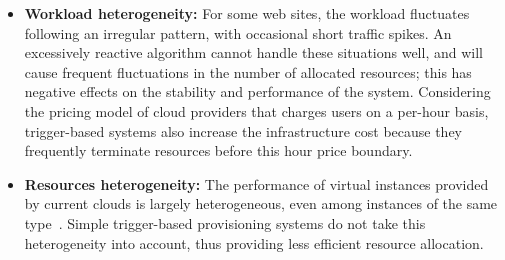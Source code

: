 \begin{itemize}
\item \textbf{Workload heterogeneity:} For some web sites, the
  workload fluctuates following an irregular pattern, with occasional
  short traffic spikes. An excessively reactive algorithm cannot
  handle these situations well, and will cause frequent fluctuations
  in the number of allocated resources; this has negative effects on
  the stability and performance of the system. Considering the pricing 
model of cloud providers that charges users on a per-hour basis, trigger-based systems also increase the infrastructure cost because they frequently terminate resources before this hour price boundary. 







\item \textbf{Resources heterogeneity:} The performance of virtual
  instances provided by current clouds is largely heterogeneous, even
  among instances of the same type~\cite{ec2Performance}.  Simple
  trigger-based provisioning systems do not take this heterogeneity
  into account, thus providing less efficient resource allocation.


\end{itemize}


